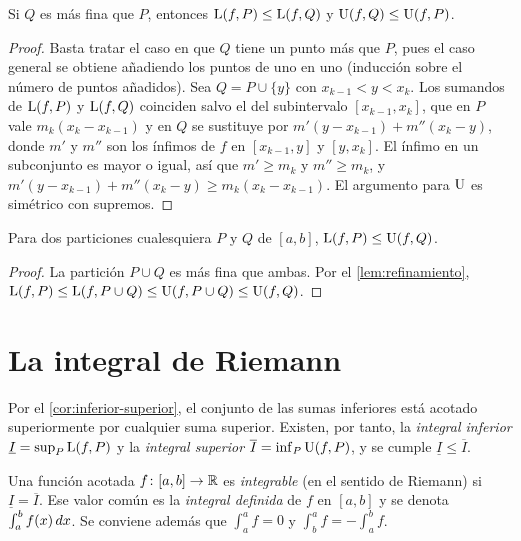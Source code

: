 \begin{lema}[Refinamiento]\label{lem:refinamiento}
Si $Q$ es más fina que $P$, entonces $\operatorname{L}(f,P)\le\operatorname{L}(f,Q)$ y $\operatorname{U}(f,Q)\le\operatorname{U}(f,P)$.
\end{lema}

\begin{proof}
Basta tratar el caso en que $Q$ tiene un punto más que $P$, pues el caso general se obtiene añadiendo los puntos de uno en uno (inducción sobre el número de puntos añadidos). Sea $Q=P\cup\{y\}$ con $x_{k-1}<y<x_k$. Los sumandos de $\operatorname{L}(f,P)$ y $\operatorname{L}(f,Q)$ coinciden salvo el del subintervalo $[x_{k-1},x_k]$, que en $P$ vale $m_k(x_k-x_{k-1})$ y en $Q$ se sustituye por $m'(y-x_{k-1})+m''(x_k-y)$, donde $m'$ y $m''$ son los ínfimos de $f$ en $[x_{k-1},y]$ y $[y,x_k]$. El ínfimo en un subconjunto es mayor o igual, así que $m'\ge m_k$ y $m''\ge m_k$, y
$m'(y-x_{k-1})+m''(x_k-y)\ge m_k(x_k-x_{k-1})$. El argumento para $\operatorname{U}$ es simétrico con supremos.
\end{proof}

\begin{corolario}\label{cor:inferior-superior}
Para dos particiones cualesquiera $P$ y $Q$ de $[a,b]$, $\operatorname{L}(f,P)\le\operatorname{U}(f,Q)$.
\end{corolario}

\begin{proof}
La partición $P\cup Q$ es más fina que ambas. Por el \cref{lem:refinamiento},
$\operatorname{L}(f,P)\le\operatorname{L}(f,P\cup Q)\le\operatorname{U}(f,P\cup Q)\le\operatorname{U}(f,Q)$.
\end{proof}

\section{La integral de Riemann}

Por el \cref{cor:inferior-superior}, el conjunto de las sumas inferiores está acotado superiormente por cualquier suma superior. Existen, por tanto, la \emph{integral inferior} $\underline{I}=\sup_P\operatorname{L}(f,P)$ y la \emph{integral superior} $\overline{I}=\inf_P\operatorname{U}(f,P)$, y se cumple $\underline{I}\le\overline{I}$.

\begin{definicion}\label{def:integral}
Una función acotada $f\colon[a,b]\to\mathbb{R}$ es \emph{integrable} (en el sentido de Riemann) si $\underline{I}=\overline{I}$. Ese valor común es la \emph{integral definida} de $f$ en $[a,b]$ y se denota $\int_a^b f(x)\mathop{}\!d x$. Se conviene además que $\int_a^a f=0$ y $\int_b^a f=-\int_a^b f$.
\end{definicion}

